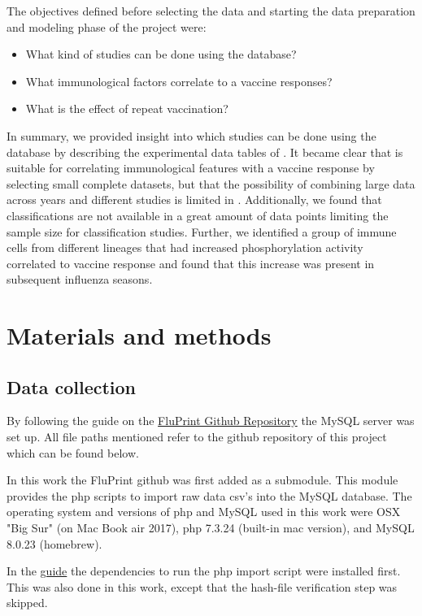 The objectives defined before selecting the data and starting the data preparation and modeling phase of the project were:
\begin{itemize}
        \item What kind of studies can be done using the \flup database?
        \item What immunological factors correlate to a vaccine responses?
        \item What is the effect of repeat vaccination?
\end{itemize}

In summary, we provided insight into which studies can be done using the \flup database by describing the experimental data tables of \flup.
It became clear that \flup is suitable for correlating immunological features with a vaccine response by selecting small complete datasets, but that the possibility of combining large data across years and different studies is limited in \flup.
Additionally, we found that classifications are not available in a great amount of data points limiting the sample size for classification studies.
Further, we identified a group of immune cells from different lineages that had increased phosphorylation activity correlated to vaccine response and found that this increase was present in subsequent influenza seasons.

\section{Materials and methods}

\subsection{Data collection}

By following the guide on the \href{https://github.com/LogIN-/fluprint}{FluPrint Github Repository} the MySQL
server was set up.
All file paths mentioned refer to the github repository of this project which can be found below.

In this work the FluPrint github was first added as a submodule.
This module provides the php scripts to import raw data csv's into the MySQL database.
The operating system and versions of php and MySQL used in this work were OSX "Big Sur" (on Mac Book air 2017), php 7.3.24 (built-in mac version), and MySQL 8.0.23 (homebrew).

In the \href{https://github.com/LogIN-/fluprint}{guide} the dependencies to run
the php import script were installed first. This was also done in this work,
except that the hash-file verification step was skipped.

